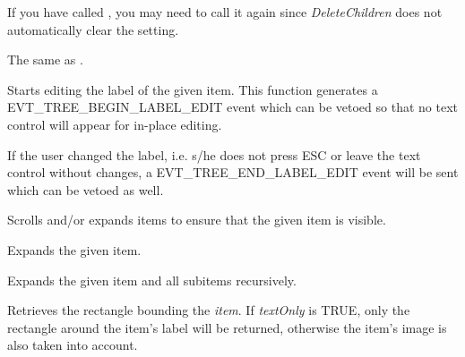 If you have called , you
may need to call it again since {\it DeleteChildren} does not automatically
clear the setting.

\label{wxtreelistctrledit}


The same as .

\label{wxtreelistctrleditlabel}


Starts editing the label of the given item. This function generates a
EVT\_TREE\_BEGIN\_LABEL\_EDIT event which can be vetoed so that no
text control will appear for in-place editing.

If the user changed the label, i.e. s/he does not press ESC or leave
the text control without changes, a EVT\_TREE\_END\_LABEL\_EDIT event
will be sent which can be vetoed as well.



\label{wxtreelistctrlensurevisible}


Scrolls and/or expands items to ensure that the given item is visible.

\label{wxtreelistctrlexpand}


Expands the given item.

\label{wxtreelistctrlexpandall}


Expands the given item and all subitems recursively.

\label{wxtreelistctrlgetitemrect}


Retrieves the rectangle bounding the {\it item}. If {\it textOnly} is TRUE,
only the rectangle around the item's label will be returned, otherwise the
item's image is also taken into account.

